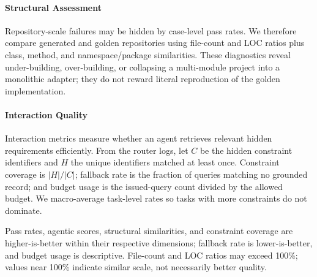 \paragraph{Structural Assessment}
Repository-scale failures may be hidden by case-level pass rates. We therefore compare generated and golden repositories using file-count and LOC ratios plus class, method, and namespace/package similarities. These diagnostics reveal under-building, over-building, or collapsing a multi-module project into a monolithic adapter; they do not reward literal reproduction of the golden implementation.

\paragraph{Interaction Quality}
Interaction metrics measure whether an agent retrieves relevant hidden requirements efficiently. From the router logs, let $C$ be the hidden constraint identifiers and $H$ the unique identifiers matched at least once. Constraint coverage is $|H|/|C|$; fallback rate is the fraction of queries matching no grounded record; and budget usage is the issued-query count divided by the allowed budget. We macro-average task-level rates so tasks with more constraints do not dominate.

Pass rates, agentic scores, structural similarities, and constraint coverage are higher-is-better within their respective dimensions; fallback rate is lower-is-better, and budget usage is descriptive. File-count and LOC ratios may exceed 100\%; values near 100\% indicate similar scale, not necessarily better quality.
